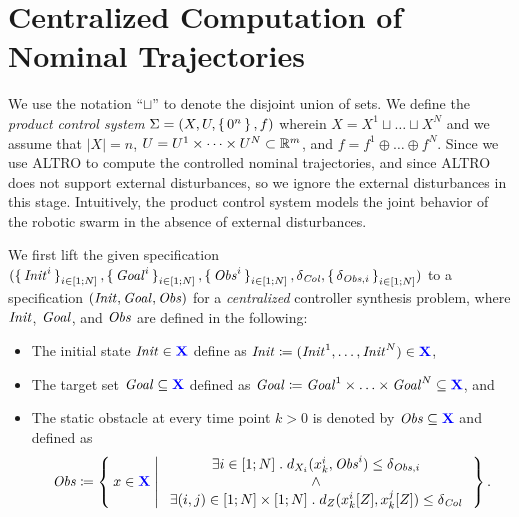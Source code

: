 
\section{Centralized Computation of Nominal Trajectories}\label{sec:nominal trajectory}
We use the notation ``$\sqcup$'' to denote the disjoint union of sets.
We define the \emph{product control system} $\Sigma = (X, U, \set{0^n}, f)$ wherein $X=X^1\sqcup \ldots \sqcup X^N$ and we assume that $|X|=n$, $U=U^1\times\dots\times U^N\subset \mathbb{R}^m$, and $f=f^{1}\oplus \ldots\oplus f^{N}$. 
Since we use ALTRO to compute the controlled nominal trajectories, and since ALTRO does not support external disturbances, so we ignore the external disturbances in this stage.
Intuitively, the product control system models the joint behavior of the robotic swarm in the absence of external disturbances.

We first lift the given specification $(\set{\mathit{Init}^i}_{i\in [1;N]}, \set{\mathit{Goal}^i}_{i\in [1;N]}, \set{\mathit{Obs}^i}_{i\in [1;N]}, \delta_{\mathit{Col}}, \set{\delta_{\mathit{Obs},i}}_{i\in [1;N]})$ to a specification $(\mathit{Init}, \mathit{Goal}, \mathit{Obs})$ for a \emph{centralized} controller synthesis problem, where $\mathit{Init}$, $\mathit{Goal}$, and $\mathit{Obs}$ are defined in the following:
\begin{itemize}
	\item The initial state $\mathit{Init}\in {\color{blue} \mathbf{X}}$ define as $\mathit{Init} \coloneqq (\mathit{Init}^1, \ldots, \mathit{Init}^N) \in {\color{blue} \mathbf{X}}$,
	\item The target set $\mathit{Goal}\subseteq {\color{blue} \mathbf{X}}$ defined as $\mathit{Goal} \coloneqq \mathit{Goal}^1\times \ldots \times \mathit{Goal}^N \subseteq {\color{blue} \mathbf{X}}$, and
	\item The static obstacle at every time point $k>0$ is denoted by $\mathit{Obs}\subseteq {\color{blue} \mathbf{X}}$ and defined as 
		\begin{equation}
			\mathit{Obs} \coloneqq 
				\Set{ x\in {\color{blue} \mathbf{X}} | 
					\begin{array}{c}
						\exists i\in [1;N]\;.\; d_{X_i}(x_k^i,\mathit{Obs}^i) \leq \delta_{\mathit{Obs},i}\\
						\wedge\\
						 \exists (i,j)\in [1;N]\times [1;N]\;.\; d_{Z}(x^i_k[Z],x^j_k[Z])\leq\delta_{\mathit{Col}}
					\end{array}}.
		\end{equation}
\end{itemize}

